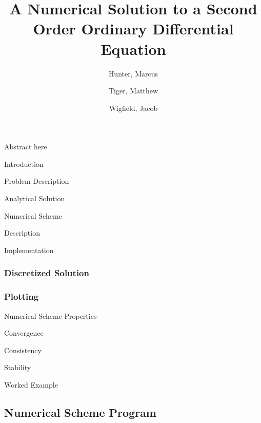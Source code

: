 \documentclass{article}
\title{
	{A Numerical Solution to a Second Order Ordinary Differential Equation}\\
}
\author{
	Hunter, Marcus \\
	\and
	Tiger, Matthew \\
	\and
	Wigfield, Jacob \\
}
\renewenvironment{abstract}
  {\small\quotation
  {\bfseries\noindent{\large\abstractname}\par\nobreak\smallskip}}
  {\endquotation}
\begin{document}
\maketitle


\newpage
\begin{abstract}
	Abstract here
\end{abstract}


\newpage
\tableofcontents
\newpage


\begin{section}{Introduction}

	\begin{subsection}{Problem Description}
	\end{subsection}

\end{section}


\begin{section}{Analytical Solution}
\end{section}


\begin{section}{Numerical Scheme}

	\begin{subsection}{Description}
	\end{subsection}

	\begin{subsection}{Implementation}

		\subsubsection{Discretized Solution}

		\subsubsection{Plotting}

	\end{subsection}

\end{section}


\begin{section}{Numerical Scheme Properties}

	\begin{subsection}{Convergence}
	\end{subsection}

	\begin{subsection}{Consistency}
	\end{subsection}

	\begin{subsection}{Stability}
	\end{subsection}

\end{section}


\begin{section}{Worked Example}
\end{section}


\newpage
\begin{appendices}
	\section{Numerical Scheme Program}
\end{appendices}
\end{document}

